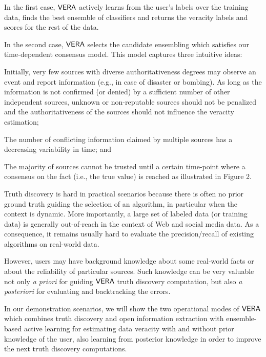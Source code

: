 In the first case, $\mathsf{VERA}$  actively learns from the user's labels over the training data, finds the best ensemble of classifiers and returns the veracity labels and scores for the rest of the data. 

In the second case, $\mathsf{VERA}$ selects the candidate ensembling which satisfies our time-dependent consensus model. This model captures three intuitive ideas: 
\begin{inparaenum}[(i)]
\item Initially, very few sources with diverse authoritativeness degrees may observe an event and report information  (e.g., in case of disaster or  bombing). As long as the information is  not confirmed (or denied)  by a sufficient number of other independent sources, unknown or non-reputable  sources should not be penalized and the authoritativeness of the sources should not influence the veracity estimation;
\item The number of conflicting information claimed by multiple sources has a decreasing variability in time; and
\item  The majority of sources cannot be trusted until a certain time-point where a consensus on the fact (i.e., the true value) is reached as illustrated in Figure 2.
\end{inparaenum}

Truth discovery is hard in practical scenarios because there is often no prior ground truth guiding
the selection of an algorithm, in particular when the context is dynamic. More importantly, a large set of labeled 
data (or training data) is generally out-of-reach in the context of Web and social media data. As a consequence, it remains usually
hard to evaluate the precision/recall of existing algorithms on real-world data. %

However, users may have background knowledge about some real-world facts or about the reliability of particular sources. Such knowledge can be very valuable not only \emph{a priori} for guiding $\mathsf{VERA}$ truth discovery computation, but also \emph{a posteriori} 
for evaluating and backtracking the errors.

In our demonstration scenarios, we will show the two operational modes of $\mathsf{VERA}$ which combines truth discovery and open information extraction with ensemble-based active learning for estimating data veracity with  and without prior knowledge of the user, also learning from posterior knowledge in order to improve the next truth discovery computations.%

